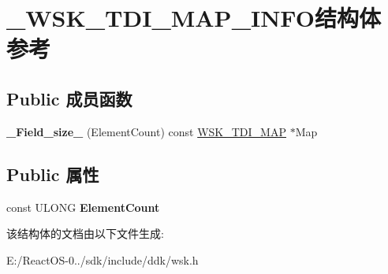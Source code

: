 \hypertarget{struct___w_s_k___t_d_i___m_a_p___i_n_f_o}{}\section{\+\_\+\+W\+S\+K\+\_\+\+T\+D\+I\+\_\+\+M\+A\+P\+\_\+\+I\+N\+F\+O结构体 参考}
\label{struct___w_s_k___t_d_i___m_a_p___i_n_f_o}
\subsection*{Public 成员函数}
\begin{DoxyCompactItemize}
\item 
\mbox{\label{struct___w_s_k___t_d_i___m_a_p___i_n_f_o_acdcf3138d05a4a19b411a2f5c18dc48d}} 
{\bfseries \+\_\+\+Field\+\_\+size\+\_\+} (Element\+Count) const \hyperlink{struct___w_s_k___t_d_i___m_a_p}{W\+S\+K\+\_\+\+T\+D\+I\+\_\+\+M\+AP} $\ast$Map
\end{DoxyCompactItemize}
\subsection*{Public 属性}
\begin{DoxyCompactItemize}
\item 
\mbox{\label{struct___w_s_k___t_d_i___m_a_p___i_n_f_o_adb2cd6e1f79ba0618a22448cf002efab}} 
const U\+L\+O\+NG {\bfseries Element\+Count}
\end{DoxyCompactItemize}


该结构体的文档由以下文件生成\+:\begin{DoxyCompactItemize}
\item 
E\+:/\+React\+O\+S-\/0../sdk/include/ddk/wsk.\+h\end{DoxyCompactItemize}
